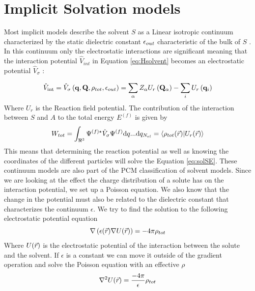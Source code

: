 \documentclass[../master_thesis.tex]{subfiles}
\begin{document}
\section{Implicit Solvation models}
Most implicit models describe the solvent $S$ as a Linear isotropic continuum
characterized by the static dielectric constant $\epsilon_{out}$ characteristic
of the bulk of $S$ \cite{Tomasi:1994wt, FossoTande:2013ka}. In this continuum
only the electrostatic interactions are significant \cite{Tomasi:1994wt} meaning
that the interaction potential $\hat{V}_{int}$ in Equation \ref{eq:Hsolvent}
becomes an electrostatic potential $\hat{V}_{\sigma}$ \cite{Tomasi:1994wt}:

\begin{equation}
  \hat{V}_{\mathrm{int}}=\hat{V}_{\sigma}\left(\mathbf{q}, \mathbf{Q},
  \rho_{tot}, \epsilon_{out}\right)=\sum_{\alpha} Z_{\alpha} U_r
  \left(\mathbf{Q}_{\alpha}\right)-\sum_{i} U_r\left(\mathbf{q}_{i}\right)
\end{equation}
Where $U_r$ is the Reaction field potential.
The contribution of the interaction between $S$ and $A$ to the total energy
$E^{(f)}$ is given by
\begin{equation}
  W_{tot} = \int_{\real^3}\Psi^{(f)\star}\hat{V}_{\sigma}\Psi^{(f)}\text{d}q...\text{d}q_{N_{el}}
  = \braket{\rho_{tot}(\rvec)|U_r(\rvec)}
\end{equation}
This means that determining the reaction potential as well as knowing the coordinates
of the different particles will solve the Equation \ref{eq:solSE}.
These continuum models are also part of the \ac{PCM} classification of solvent
models.
Since we are looking at the effect the charge distribution of a solute has on
the interaction potential, we set up a Poisson equation. We also know that the change in
the potential must also be related to the dielectric constant that characterizes
the continuum $\epsilon$. We try to find the solution to the following
electrostatic potential equation
\begin{equation}
  \nabla\left( \epsilon(\vec{r}) \nabla U(\vec{r})\right) = -4\pi\rho_{tot}
\end{equation}
Where $U(\vec{r})$ is the electrostatic potential of the interaction between
the solute and the solvent. If $\epsilon$ is a constant we can move it outside
of the gradient operation and solve the Poisson equation with an effective $\rho$
\begin{equation}
  \nabla^2U(\vec{r})=\frac{-4\pi}{\epsilon}\rho_{tot}
\end{equation}
\end{document}
